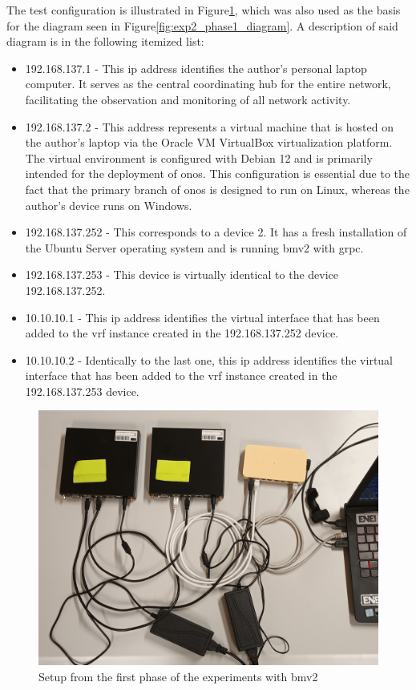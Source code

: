 The test configuration is illustrated in Figure\ref{fig:exp2_phase1_setup}, which was also used as the basis for the diagram seen in Figure\ref{fig:exp2_phase1_diagram}. A description of said diagram is in the following itemized list:
\begin{itemize}
	\item 192.168.137.1 - This \gls{ip} address identifies the author's personal laptop computer. It serves as the central coordinating hub for the entire network, facilitating the observation and monitoring of all network activity.
	\item 192.168.137.2 - This address represents a virtual machine that is hosted on the author's laptop via the Oracle VM VirtualBox virtualization platform. The virtual environment is configured with Debian 12 and is primarily intended for the deployment of \gls{onos}. This configuration is essential due to the fact that the primary branch of \gls{onos} is designed to run on Linux, whereas the author's device runs on Windows.
	\item 192.168.137.252 - This corresponds to a device 2. It has a fresh installation of the Ubuntu Server operating system and is running \gls{bmv2} with grpc.
	\item 192.168.137.253 - This device is virtually identical to the device 192.168.137.252.
	\item 10.10.10.1 - This \gls{ip} address identifies the virtual interface that has been added to the \gls{vrf} instance created in the 192.168.137.252 device.
	\item 10.10.10.2 - Identically to the last one, this \gls{ip} address identifies the virtual interface that has been added to the \gls{vrf} instance created in the 192.168.137.253 device.
\end{itemize}

\begin{figure}
	\centering
	\includegraphics[width=\textwidth]{Chapters/Figures/tests/bmv2_phase_1/20241122_185833.jpg}
	\caption{Setup from the first phase of the experiments with \gls{bmv2}}
	\label{fig:exp2_phase1_setup}
\end{figure}

